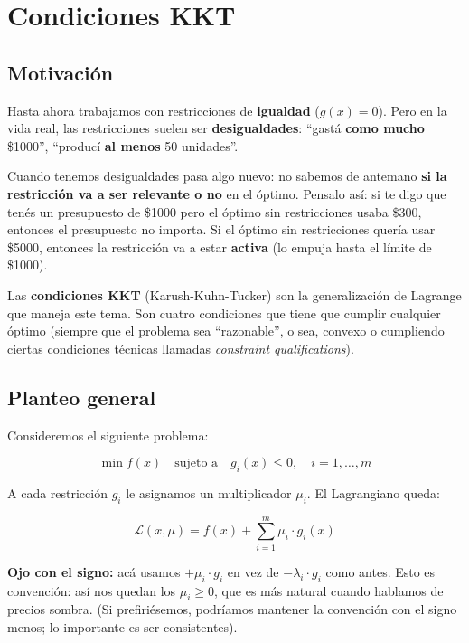 \documentclass[12pt]{article}
\begin{document}
\section{Condiciones KKT}

\subsection{Motivación}

Hasta ahora trabajamos con restricciones de \textbf{igualdad} ($g(x) = 0$). Pero en la vida real, las restricciones suelen ser \textbf{desigualdades}: ``gastá \textbf{como mucho} \$1000'', ``producí \textbf{al menos} 50 unidades''.

\vspace{0.5em}

Cuando tenemos desigualdades pasa algo nuevo: no sabemos de antemano \textbf{si la restricción va a ser relevante o no} en el óptimo. Pensalo así: si te digo que tenés un presupuesto de \$1000 pero el óptimo sin restricciones usaba \$300, entonces el presupuesto no importa. Si el óptimo sin restricciones quería usar \$5000, entonces la restricción va a estar \textbf{activa} (lo empuja hasta el límite de \$1000).

\vspace{0.5em}

Las \textbf{condiciones KKT} (Karush-Kuhn-Tucker) son la generalización de Lagrange que maneja este tema. Son cuatro condiciones que tiene que cumplir cualquier óptimo (siempre que el problema sea ``razonable'', o sea, convexo o cumpliendo ciertas condiciones técnicas llamadas \textit{constraint qualifications}).

\subsection{Planteo general}

Consideremos el siguiente problema:

\[
\min f(x) \quad \text{sujeto a} \quad g_i(x) \leq 0, \quad i = 1, \ldots, m
\]

A cada restricción $g_i$ le asignamos un multiplicador $\mu_i$. El Lagrangiano queda:

\[
\mathcal{L}(x, \mu) = f(x) + \sum_{i=1}^{m} \mu_i \cdot g_i(x)
\]

\vspace{0.5em}

\textbf{Ojo con el signo:} acá usamos $+ \mu_i \cdot g_i$ en vez de $- \lambda_i \cdot g_i$ como antes. Esto es convención: así nos quedan los $\mu_i \geq 0$, que es más natural cuando hablamos de precios sombra. (Si prefiriésemos, podríamos mantener la convención con el signo menos; lo importante es ser consistentes).
\end{document}
